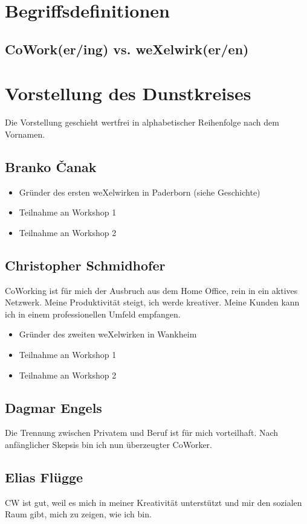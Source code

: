 \begin{appendix}


\chapter{Begriffsdefinitionen}
  \section{CoWork(er/ing) vs. weXelwirk(er/en)}

\chapter{Vorstellung des Dunstkreises}
Die Vorstellung geschieht wertfrei in alphabetischer Reihenfolge nach dem Vornamen.
  \section{Branko Čanak}
\begin{itemize}
\item {Gründer des ersten weXelwirken in Paderborn (siehe Geschichte)}
\item {Teilnahme an Workshop 1}
\item {Teilnahme an Workshop 2}
\end{itemize}
  \section{Christopher Schmidhofer}
\glqq CoWorking ist für mich der Ausbruch aus dem Home Office, rein in ein aktives Netzwerk. Meine Produktivität steigt, ich werde kreativer. Meine Kunden kann ich in einem professionellen Umfeld empfangen. \grqq
\begin{itemize}
\item {Gründer des zweiten weXelwirken in Wankheim}
\item {Teilnahme an Workshop 1}
\item {Teilnahme an Workshop 2}
\end{itemize}

  \section{Dagmar Engels}
\glqq Die Trennung zwischen Privatem und Beruf ist für mich vorteilhaft. Nach anfänglicher Skepsis bin ich nun überzeugter CoWorker. \grqq
  \section{Elias Flügge}
\glqq CW ist gut, weil es mich in meiner Kreativität unterstützt und mir den sozialen Raum gibt, mich zu zeigen, wie ich bin. \grqq

\end{appendix}
